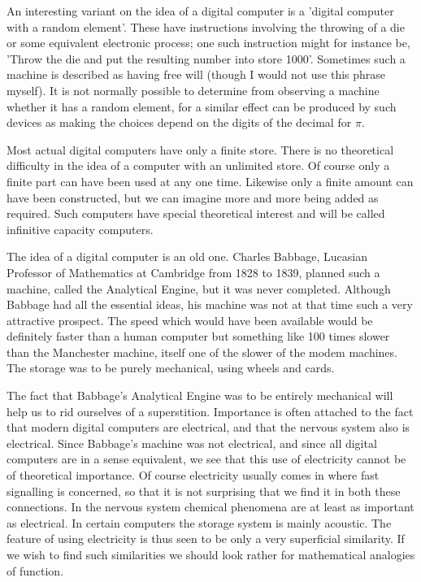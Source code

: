     An interesting variant on the idea of a digital computer is a 'digital computer with a random element'. These have instructions involving the throwing of a die or some equivalent electronic process; one such instruction might for instance be, 'Throw the die and put the resulting number into store 1000'. Sometimes such a machine is described as having free will (though I would not use this phrase myself). It is not normally possible to determine from observing a machine whether it has a random element, for a similar effect can be produced by such devices as making the choices depend on the digits of the decimal for $\pi$.

    Most actual digital computers have only a finite store. There is no theoretical difficulty in the idea of a computer with an unlimited store. Of course only a finite part can have been used at any one time. Likewise only a finite amount can have been constructed, but we can imagine more and more being added as required. Such computers have special theoretical interest and will be called infinitive capacity computers.

    The idea of a digital computer is an old one. Charles Babbage, Lucasian Professor of Mathematics at Cambridge from 1828 to 1839, planned such a machine, called the Analytical Engine, but it was never completed. Although Babbage had all the essential ideas, his machine was not at that time such a very attractive prospect. The speed which would have been available would be definitely faster than a human computer but something like 100 times slower than the Manchester machine, itself one of the slower of the modem machines. The storage was to be purely mechanical, using wheels and cards.

    The fact that Babbage's Analytical Engine was to be entirely mechanical will help us to rid ourselves of a superstition. Importance is often attached to the fact that modern digital computers are electrical, and that the nervous system also is electrical. Since Babbage's machine was not electrical, and since all digital computers are in a sense equivalent, we see that this use of electricity cannot be of theoretical importance. Of course electricity usually comes in where fast signalling is concerned, so that it is not surprising that we find it in both these connections. In the nervous system chemical phenomena are at least as important as electrical. In certain computers the storage system is mainly acoustic. The feature of using electricity is thus seen to be only a very superficial similarity. If we wish to find such similarities we should look rather for mathematical analogies of function.